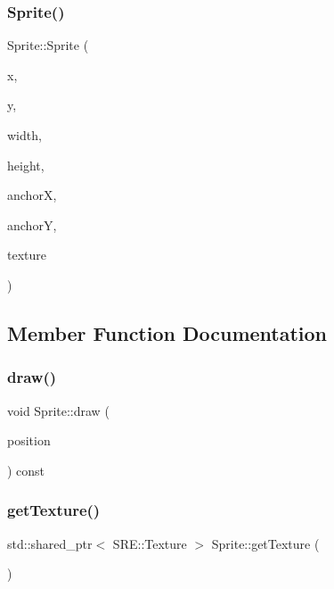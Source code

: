 \subsubsection{\texorpdfstring{Sprite()}{Sprite()}}
{\footnotesize\ttfamily Sprite\+::\+Sprite (\begin{DoxyParamCaption}\item[{int}]{x,  }\item[{int}]{y,  }\item[{int}]{width,  }\item[{int}]{height,  }\item[{float}]{anchorX,  }\item[{float}]{anchorY,  }\item[{std\+::shared\+\_\+ptr$<$ S\+R\+E\+::\+Texture $>$}]{texture }\end{DoxyParamCaption})}



\subsection{Member Function Documentation}
\hypertarget{class_mason_1_1_sprite_a6229a8bef359a9023f6510978bd95b0b}{}\label{class_mason_1_1_sprite_a6229a8bef359a9023f6510978bd95b0b} 
\subsubsection{\texorpdfstring{draw()}{draw()}}
{\footnotesize\ttfamily void Sprite\+::draw (\begin{DoxyParamCaption}\item[{glm\+::vec3}]{position }\end{DoxyParamCaption}) const}

\hypertarget{class_mason_1_1_sprite_a712bae6921e612c77150a2741a0be7b1}{}\label{class_mason_1_1_sprite_a712bae6921e612c77150a2741a0be7b1} 
\subsubsection{\texorpdfstring{get\+Texture()}{getTexture()}}
{\footnotesize\ttfamily std\+::shared\+\_\+ptr$<$ S\+R\+E\+::\+Texture $>$ Sprite\+::get\+Texture (\begin{DoxyParamCaption}{ }\end{DoxyParamCaption})}


